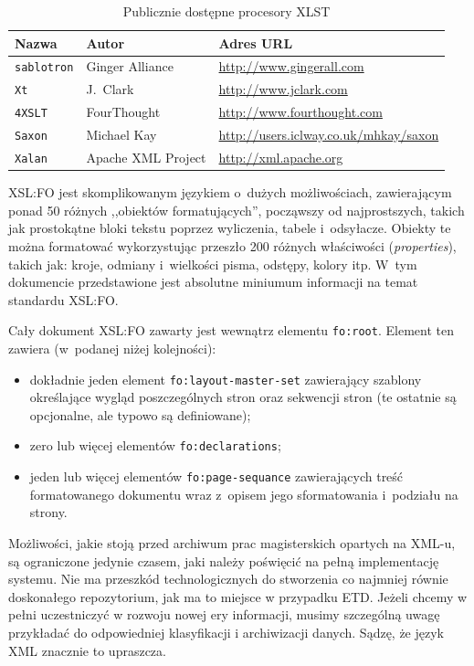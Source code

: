 \documentclass[brudnopis]{xmgr}
\begin{document}
\begin{table}[!htb]
\begin{tabular}{|l|l|l|} \hline
Nazwa & Autor      & Adres URL \\ \hline
\texttt{sablotron} & Ginger Alliance & \url{http://www.gingerall.com} \\ \hline
\texttt{Xt}        & J.~Clark & \url{http://www.jclark.com} \\ \hline
\texttt{4XSLT}     & FourThought & \url{http://www.fourthought.com} \\ \hline
\texttt{Saxon}     & Michael Kay &  \url{http://users.iclway.co.uk/mhkay/saxon} \\ \hline
\texttt{Xalan}     & Apache XML Project & \url{http://xml.apache.org} \\ \hline
\end{tabular}
\caption{Publicznie dostępne procesory XLST\label{zest:proces:xslt}}
\end{table}

XSL:FO jest skomplikowanym językiem o~dużych możliwościach,
zawierającym ponad 50 różnych ,,obiektów formatujących'', począwszy od
najprostszych, takich jak prostokątne bloki tekstu poprzez wyliczenia,
tabele i~odsyłacze. Obiekty te można formatować wykorzystując przeszło
200 różnych właściwości (\emph{properties\/}), takich jak: kroje,
odmiany i~wielkości pisma, odstępy, kolory itp.  
W~tym dokumencie przedstawione jest absolutne miniumum informacji 
na temat standardu XSL:FO.

Cały dokument XSL:FO zawarty jest wewnątrz elementu \texttt{fo:root}.
Element ten zawiera (w~podanej niżej kolejności):

\begin{itemize}
\item dokładnie jeden element \texttt{fo:layout-master-set} zawierający
  szablony określające wygląd poszczególnych stron oraz sekwencji
  stron (te ostatnie są opcjonalne, ale typowo są definiowane);
\item zero lub więcej elementów \texttt{fo:declarations};
\item jeden lub więcej elementów \texttt{fo:page-sequance}
 zawierających treść formatowanego dokumentu wraz z~opisem
 jego sformatowania i~podziału na strony.
\end{itemize}

\summary
Możliwości, jakie stoją przed archiwum prac magisterskich opartych na
XML-u, są ograniczone jedynie czasem, jaki należy poświęcić na pełną
implementację systemu. Nie ma przeszkód technologicznych do stworzenia
co najmniej równie doskonałego repozytorium, jak ma to miejsce w
przypadku ETD. Jeżeli chcemy w pełni uczestniczyć w rozwoju nowej ery
informacji, musimy szczególną uwagę przykładać do odpowiedniej
klasyfikacji i archiwizacji danych. Sądzę, że język XML znacznie to
upraszcza.
\end{document}
